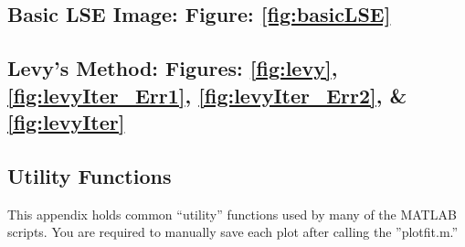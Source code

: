 \subsection{Basic LSE Image: Figure: \ref{fig:basicLSE}}


\subsection{Levy's Method: Figures: \ref{fig:levy}, \ref{fig:levyIter_Err1}, \ref{fig:levyIter_Err2}, \& \ref{fig:levyIter}}




\subsection{Utility Functions}
\label{app:utilityFuns}
This appendix holds common ``utility'' functions used by many of the MATLAB scripts. You are required to manually save each plot after calling the ''plotfit.m.''





